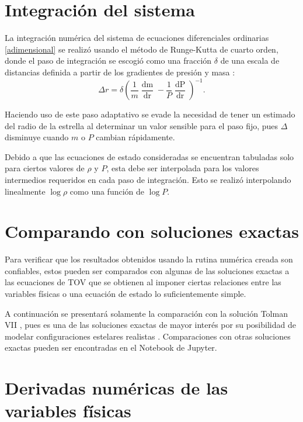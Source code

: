 \section{Integración del sistema}


La integración numérica del sistema de ecuaciones diferenciales ordinarias \eqref{adimensional} se realizó usando el método de Runge-Kutta de cuarto orden,  donde el paso de integración se escogió como una fracción $\delta$ de una escala de distancias definida a partir de los gradientes de presión y masa \cite{Baym1971TheModels}: 
\begin{equation}
    \Delta{r} = \delta \left( \frac { 1 } { m } \frac { \mathop{dm} } { \mathop{dr}  } - \frac { 1 } { P } \frac { \mathop{dP}  } { \mathop{dr} } \right) ^ { - 1 }.
\end{equation}

Haciendo uso de este paso adaptativo se evade la necesidad de tener un estimado del radio de la estrella al determinar un valor sensible para el paso fijo, pues $\Delta$ disminuye cuando $m$ o $P$ cambian rápidamente.

Debido a que las ecuaciones de estado consideradas se encuentran tabuladas solo para ciertos valores de $\rho$ y $P$, esta debe ser interpolada para los valores intermedios requeridos en cada paso de integración. Esto se realizó interpolando linealmente $\log{\rho}$ como una función de $\log{P}$. 

\section{Comparando con soluciones exactas}

Para verificar que los resultados obtenidos usando la rutina numérica creada son confiables, estos pueden ser comparados con algunas de las soluciones exactas a las ecuaciones de TOV que se obtienen al imponer ciertas relaciones entre las variables físicas o una ecuación de estado lo suficientemente simple. 

A continuación se presentará solamente la comparación con la solución Tolman VII , pues es una de las soluciones exactas de mayor interés por su posibilidad de modelar configuraciones estelares realistas . Comparaciones con otras soluciones exactas pueden ser encontradas en el Notebook de Jupyter.    

\section{Derivadas numéricas de las variables físicas}\label{NumDer}  